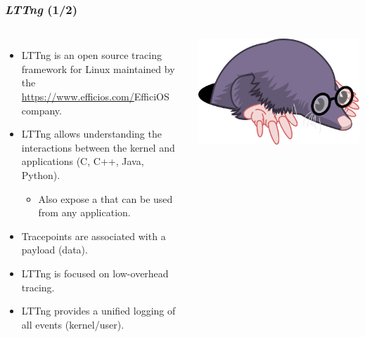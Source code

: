 \begin{frame}
  \frametitle{{\em LTTng} (1/2)}
  \begin{columns}
    \begin{itemize}
      \item LTTng is an open source tracing framework for Linux maintained by
            the \url{https://www.efficios.com/}{EfficiOS} company.
      \item LTTng allows understanding the interactions between the kernel and
            applications (C, C++, Java, Python).
      \begin{itemize}
        \item Also expose a  that can be used from any
              application.
      \end{itemize}
      \item Tracepoints are associated with a payload (data).
      \item LTTng is focused on low-overhead tracing.
      \item LTTng provides a unified logging of all events (kernel/user).
    \end{itemize}
    \includegraphics[height=0.3\textheight]{slides/debugging-system-wide-profiling/lttng-logo.jpg}
  \end{columns}
\end{frame}

